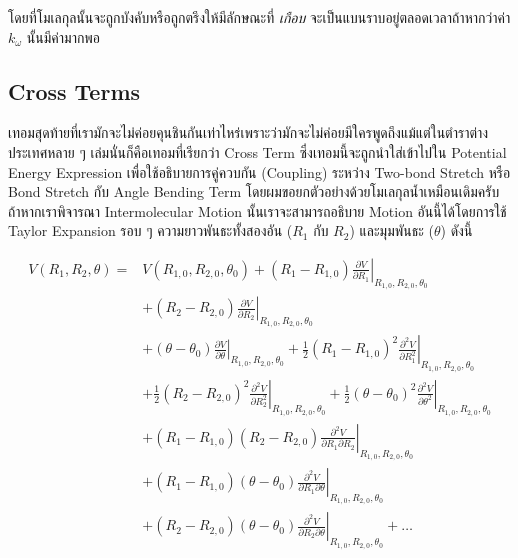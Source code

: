 \noindent โดยที่โมเลกุลนั้นจะถูกบังคับหรือถูกตรึงให้มีลักษณะที่ \textit{เกือบ} จะเป็นแบนราบอยู่ตลอดเวลาถ้าหากว่าค่า $k_{\omega}$
นั้นมีค่ามากพอ

\subsection{Cross Terms}

เทอมสุดท้ายที่เรามักจะไม่ค่อยคุนชินกันเท่าไหร่เพราะว่ามักจะไม่ค่อยมีใครพูดถึงแม้แต่ในตำราต่างประเทศหลาย ๆ เล่มนั่นก็คือเทอมที่เรียกว่า Cross Term
ซึ่งเทอมนี้จะถูกนำใส่เข้าไปใน Potential Energy Expression เพื่อใช้อธิบายการคู่ควบกัน (Coupling) ระหว่าง Two-bond Stretch
หรือ Bond Stretch กับ Angle Bending Term โดยผมขอยกตัวอย่างด้วยโมเลกุลน้ำเหมือนเดิมครับ ถ้าหากเราพิจารณา Intermolecular Motion
นั้นเราจะสามารถอธิบาย Motion อันนี้ได้โดยการใช้ Taylor Expansion รอบ ๆ ความยาวพันธะทั้งสองอัน ($R_{1}$ กับ $R_{2}$) และมุมพันธะ
($\theta$) ดังนี้

\begin{align}
  V\left(R_1, R_2, \theta\right)
  = &
  V\left(R_{1,0}, R_{2,0}, \theta_0\right)
  + \left.\left(R_1-R_{1,0}\right) \frac{\partial V}{\partial R_1}\right|_{R_{1,0}, R_{2,0}, \theta_0} \nonumber    \\
   & + \left.\left(R_2-R_{2,0}\right) \frac{\partial V}{\partial R_2}\right|_{R_{1,0}, R_{2,0}, \theta_0} \nonumber \\
   & + \left.\left(\theta-\theta_0\right) \frac{\partial V}{\partial \theta}\right|_{R_{1,0}, R_{2,0}, \theta_0}
  + \left.\frac{1}{2}\left(R_1-R_{1,0}\right)^2
  \frac{\partial^2 V}{\partial R_1^2}\right|_{R_{1,0}, R_{2,0}, \theta_0} \nonumber                                 \\
   & + \left.\frac{1}{2}\left(R_2-R_{2,0}\right)^2
  \frac{\partial^2 V}{\partial R_2^2}\right|_{R_{1,0}, R_{2,0}, \theta_0}
  + \left.\frac{1}{2}\left(\theta-\theta_0\right)^2
  \frac{\partial^2 V}{\partial \theta^2}\right|_{R_{1,0}, R_{2,0}, \theta_0} \nonumber                              \\
   & + \left.\left(R_1-R_{1,0}\right)\left(R_2-R_{2,0}\right)
  \frac{\partial^2 V}{\partial R_1 \partial R_2}\right|_{R_{1,0}, R_{2,0}, \theta_0} \nonumber                      \\
   & + \left.\left(R_1-R_{1,0}\right)\left(\theta-\theta_0\right)
  \frac{\partial^2 V}{\partial R_1 \partial \theta}\right|_{R_{1,0}, R_{2,0}, \theta_0} \nonumber                   \\
   & + \left.\left(R_2-R_{2,0}\right)\left(\theta-\theta_0\right)
  \frac{\partial^2 V}{\partial R_2 \partial \theta}\right|_{R_{1,0}, R_{2,0}, \theta_0} + \ldots
\end{align}

